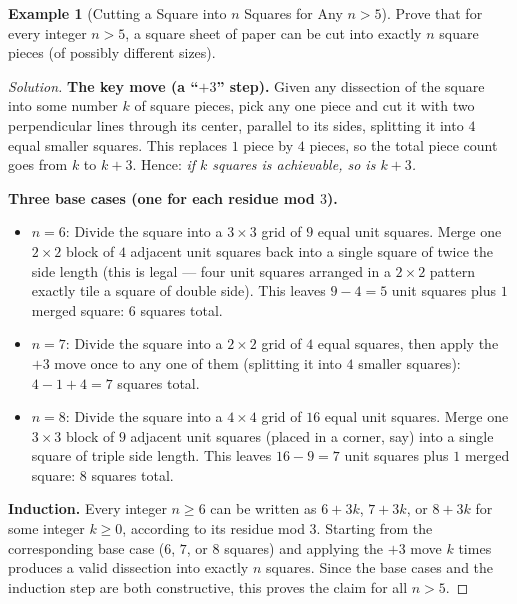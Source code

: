 \documentclass[11pt]{article}
\theoremstyle{definition}
\newtheorem{example}{Example}[section]
\begin{document}
\begin{example}[Cutting a Square into $n$ Squares for Any $n>5$]
Prove that for every integer $n>5$, a square sheet of paper can be cut into exactly $n$ square pieces (of possibly different sizes).
\end{example}
\begin{proof}[Solution]
\textbf{The key move (a ``$+3$'' step).} Given any dissection of the square into some number $k$ of square pieces, pick any one piece and cut it with two perpendicular lines through its center, parallel to its sides, splitting it into $4$ equal smaller squares. This replaces $1$ piece by $4$ pieces, so the total piece count goes from $k$ to $k+3$. Hence: \emph{if $k$ squares is achievable, so is $k+3$.}

\textbf{Three base cases (one for each residue mod $3$).}
\begin{itemize}
\item $n=6$: Divide the square into a $3\times3$ grid of $9$ equal unit squares. Merge one $2\times2$ block of $4$ adjacent unit squares back into a single square of twice the side length (this is legal — four unit squares arranged in a $2\times2$ pattern exactly tile a square of double side). This leaves $9-4=5$ unit squares plus $1$ merged square: $6$ squares total.
\item $n=7$: Divide the square into a $2\times2$ grid of $4$ equal squares, then apply the $+3$ move once to any one of them (splitting it into $4$ smaller squares): $4-1+4=7$ squares total.
\item $n=8$: Divide the square into a $4\times4$ grid of $16$ equal unit squares. Merge one $3\times3$ block of $9$ adjacent unit squares (placed in a corner, say) into a single square of triple side length. This leaves $16-9=7$ unit squares plus $1$ merged square: $8$ squares total.
\end{itemize}

\textbf{Induction.} Every integer $n\ge6$ can be written as $6+3k$, $7+3k$, or $8+3k$ for some integer $k\ge0$, according to its residue mod $3$. Starting from the corresponding base case ($6$, $7$, or $8$ squares) and applying the $+3$ move $k$ times produces a valid dissection into exactly $n$ squares. Since the base cases and the induction step are both constructive, this proves the claim for all $n>5$.
\end{proof}
\end{document}
